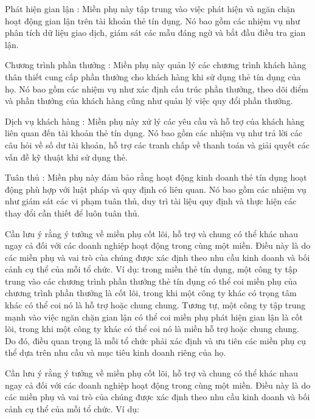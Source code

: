 Phát hiện gian lận : Miền phụ này tập trung vào việc phát hiện và ngăn chặn hoạt động gian lận trên tài khoản thẻ tín dụng. Nó bao gồm các nhiệm vụ như phân tích dữ liệu giao dịch, giám sát các mẫu đáng ngờ và bắt đầu điều tra gian lận.

Chương trình phần thưởng : Miền phụ này quản lý các chương trình khách hàng thân thiết cung cấp phần thưởng cho khách hàng khi sử dụng thẻ tín dụng của họ. Nó bao gồm các nhiệm vụ như xác định cấu trúc phần thưởng, theo dõi điểm và phần thưởng của khách hàng cũng như quản lý việc quy đổi phần thưởng.

Dịch vụ khách hàng : Miền phụ này xử lý các yêu cầu và hỗ trợ của khách hàng liên quan đến tài khoản thẻ tín dụng. Nó bao gồm các nhiệm vụ như trả lời các câu hỏi về số dư tài khoản, hỗ trợ các tranh chấp về thanh toán và giải quyết các vấn đề kỹ thuật khi sử dụng thẻ.

Tuân thủ : Miền phụ này đảm bảo rằng hoạt động kinh doanh thẻ tín dụng hoạt động phù hợp với luật pháp và quy định có liên quan. Nó bao gồm các nhiệm vụ như giám sát các vi phạm tuân thủ, duy trì tài liệu quy định và thực hiện các thay đổi cần thiết để luôn tuân thủ.

Cần lưu ý rằng ý tưởng về miền phụ cốt lõi, hỗ trợ và chung có thể khác nhau ngay cả đối với các doanh nghiệp hoạt động trong cùng một miền. Điều này là do các miền phụ và vai trò của chúng được xác định theo nhu cầu kinh doanh và bối cảnh cụ thể của mỗi tổ chức. Ví dụ: trong miền thẻ tín dụng, một công ty tập trung vào các chương trình phần thưởng thẻ tín dụng có thể coi miền phụ của chương trình phần thưởng là cốt lõi, trong khi một công ty khác có trọng tâm khác có thể coi nó là hỗ trợ hoặc chung chung. Tương tự, một công ty tập trung mạnh vào việc ngăn chặn gian lận có thể coi miền phụ phát hiện gian lận là cốt lõi, trong khi một công ty khác có thể coi nó là miền hỗ trợ hoặc chung chung. Do đó, điều quan trọng là mỗi tổ chức phải xác định và ưu tiên các miền phụ cụ thể dựa trên nhu cầu và mục tiêu kinh doanh riêng của họ.




Cần lưu ý rằng ý tưởng về miền phụ cốt lõi, hỗ trợ và chung có thể khác nhau ngay cả đối với các doanh nghiệp hoạt động trong cùng một miền. Điều này là do các miền phụ và vai trò của chúng được xác định theo nhu cầu kinh doanh và bối cảnh cụ thể của mỗi tổ chức. Ví dụ:

